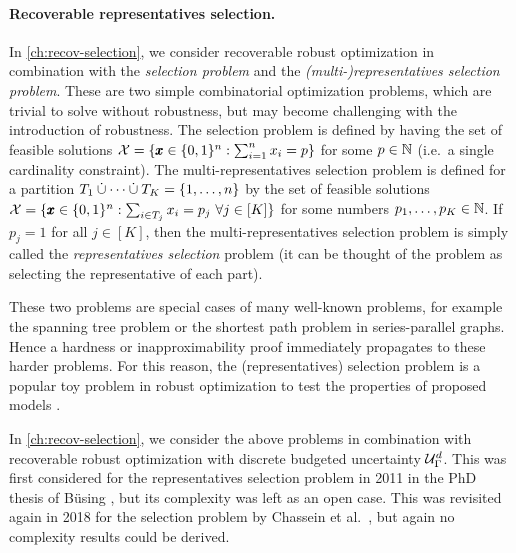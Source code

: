 \paragraph*{Recoverable representatives selection.}
In \cref{ch:recov-selection}, we consider recoverable robust optimization in combination with the \emph{selection problem} and the \emph{(multi-)representatives selection problem}. 
These are two simple combinatorial optimization problems, which are trivial to solve without robustness, but may become challenging with the introduction of robustness.
The selection problem is defined by having the set of feasible solutions $\mathcal{X} = \{ \pmb x \in \{ 0,1 \}^n : \sum_{i=1}^n x_i = p \}$ for some $p \in \mathbb{N}$ (i.e.\ a single cardinality constraint). 
The multi-representatives selection problem is defined for a partition $T_1 \dotunion \dots \dotunion T_K = \fromto{1}{n}$ by the set of feasible solutions $\mathcal{X} = \{  \pmb{x}\in \{0,1\}^n : \sum_{i\in T_j} x_i = p_j\ \forall j \in [K]  \}$ for some numbers $p_1,\dots,p_K \in \mathbb{N}$. If $p_j = 1$ for all $j \in [K]$, then the multi-representatives selection problem is simply called the \emph{representatives selection} problem (it can be thought of the problem as selecting the representative of each part).


These two problems are special cases of many well-known problems, for example the spanning tree problem or the shortest path problem in series-parallel graphs. Hence a hardness or inapproximability proof immediately propagates to these harder problems. For this reason, the (representatives) selection problem is a popular toy problem in robust optimization to test the properties of proposed models \cite{kasperski2015approximability,averbakh2001complexity,conde2004improved,dolgui2012min,deineko2013complexity,goerigk2019robust} 
.

In \cref{ch:recov-selection}, we consider the above problems in combination with recoverable robust optimization with discrete budgeted uncertainty $\mathcal{U}^d_\Gamma$. 
This was first considered for the representatives selection problem in 2011 in the PhD thesis of Büsing \cite{busing2011phd}, but its complexity was left as an open case. 
This was revisited again in 2018 for the selection problem by Chassein et al.\ \cite{chassein2018recoverable}, but again no complexity results could be derived. 


